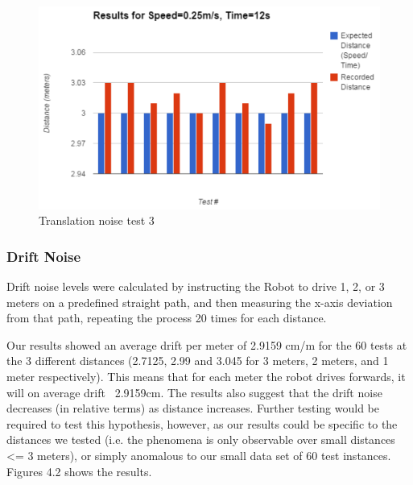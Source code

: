 \documentclass{article}
\begin{document}
\begin{multicols}{2}
\begin{figure}[H]
\begin{center}
	\includegraphics[width=0.9\linewidth]{ExperimentalResults3}
	\caption{Translation noise test 3}
	\end{center}
	\end{figure}
	
	\subsubsection{Drift Noise}
	Drift noise levels were calculated by instructing the Robot to drive 1, 2, or 3 meters on a predefined straight path, and then measuring the x-axis deviation from that path, repeating the process 20 times for each distance.

Our results showed an average drift per meter of 2.9159 cm/m for the 60 tests at the 3 different distances (2.7125, 2.99 and 3.045 for 3 meters, 2 meters, and 1 meter respectively). This means that for each meter the robot drives forwards, it will on average drift ~2.9159cm. The results also suggest that the drift noise decreases (in relative terms) as distance increases. Further testing would be required to test this hypothesis, however, as our results could be specific to the distances we tested (i.e. the phenomena is only observable over small distances <= 3 meters), or simply anomalous to our small data set of 60 test instances. Figures 4.2 shows the results.
	

\end{multicols}
\end{document}
